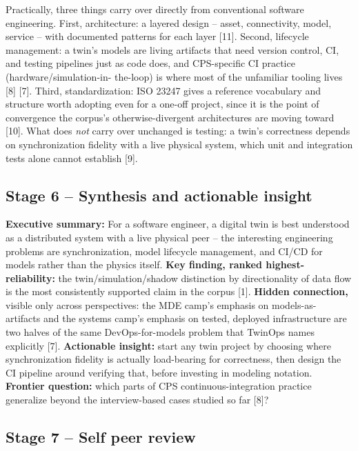 \documentclass[
  12pt,
  a4paper,
]{article}
\begin{document}
Practically, three things carry over directly from conventional software
engineering. First, architecture: a layered design -- asset,
connectivity, model, service -- with documented patterns for each layer
{[}11{]}. Second, lifecycle management: a twin's models are living
artifacts that need version control, CI, and testing pipelines just as
code does, and CPS-specific CI practice (hardware/simulation-in-
the-loop) is where most of the unfamiliar tooling lives {[}8{]} {[}7{]}.
Third, standardization: ISO 23247 gives a reference vocabulary and
structure worth adopting even for a one-off project, since it is the
point of convergence the corpus's otherwise-divergent architectures are
moving toward {[}10{]}. What does \emph{not} carry over unchanged is
testing: a twin's correctness depends on synchronization fidelity with a
live physical system, which unit and integration tests alone cannot
establish {[}9{]}.

\subsection{Stage 6 -- Synthesis and actionable
insight}\label{stage-6-synthesis-and-actionable-insight}

\textbf{Executive summary:} For a software engineer, a digital twin is
best understood as a distributed system with a live physical peer -- the
interesting engineering problems are synchronization, model lifecycle
management, and CI/CD for models rather than the physics itself.
\textbf{Key finding, ranked highest-reliability:} the
twin/simulation/shadow distinction by directionality of data flow is the
most consistently supported claim in the corpus {[}1{]}. \textbf{Hidden
connection,} visible only across perspectives: the MDE camp's emphasis
on models-as- artifacts and the systems camp's emphasis on tested,
deployed infrastructure are two halves of the same DevOps-for-models
problem that TwinOps names explicitly {[}7{]}. \textbf{Actionable
insight:} start any twin project by choosing where synchronization
fidelity is actually load-bearing for correctness, then design the CI
pipeline around verifying that, before investing in modeling notation.
\textbf{Frontier question:} which parts of CPS continuous-integration
practice generalize beyond the interview-based cases studied so far
{[}8{]}?

\subsection{Stage 7 -- Self peer review}\label{stage-7-self-peer-review}
\end{document}
